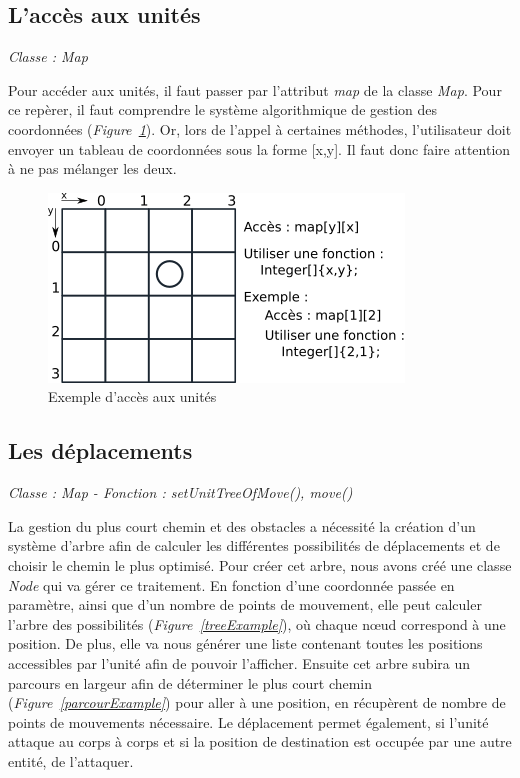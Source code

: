\documentclass[a4paper,11pt]{report}
\begin{document}
        \subsection{L'accès aux unités}
          \begin{center}
           \textit{Classe : Map}
          \end{center}
          Pour accéder aux unités, il faut passer par l'attribut \textit{map} de la classe \textit{Map}. Pour ce repèrer, il faut comprendre le système algorithmique de gestion des coordonnées (\textit{Figure~\ref{xyExample}}). Or, lors de l'appel à certaines méthodes, l'utilisateur doit envoyer un tableau de coordonnées sous la forme [x,y]. Il faut donc faire attention à ne pas mélanger les deux.
        
        \begin{figure}[th]
          \begin{center}
            \includegraphics[scale=0.6]{Assets/xyExemple.png}
            \caption{Exemple d'accès aux unités}
            \label{xyExample}
          \end{center}
        \end{figure}
        
        
        \subsection{Les déplacements}
        \begin{center}
          \textit{Classe : Map - Fonction : setUnitTreeOfMove(), move()}
        \end{center}
          La gestion du plus court chemin et des obstacles a nécessité la création d'un système d'arbre afin de calculer les différentes possibilités de déplacements et de choisir le chemin le plus optimisé. Pour créer cet arbre, nous avons créé une classe \textit{Node} qui va gérer ce traitement. En fonction d'une coordonnée passée en paramètre, ainsi que d'un nombre de points de mouvement, elle peut calculer l'arbre des possibilités (\textit{Figure~\ref{treeExample}}), où chaque nœud correspond à une position. De plus, elle va nous générer une liste contenant toutes les positions accessibles par l'unité afin de pouvoir l'afficher. Ensuite cet arbre subira un parcours en largeur afin de déterminer le plus court chemin (\textit{Figure~\ref{parcourExample}}) pour aller à une position, en récupèrent de nombre de points de mouvements nécessaire. Le déplacement permet également, si l'unité attaque au corps à corps et si la position de destination est occupée par une autre entité, de l'attaquer.
          
\end{document}
